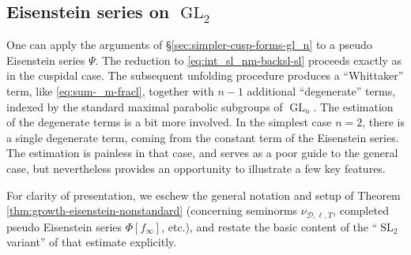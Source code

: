 \documentclass[reqno]{amsart}
\DeclareMathOperator{\SL}{SL}
\DeclareMathOperator{\GL}{GL}
\theoremstyle{plain} \newtheorem{theorem} {Theorem}
\theoremstyle{definition} \newtheorem{definition} [theorem] {Definition}
\theoremstyle{itplain} %
\numberwithin{equation}{section}
\numberwithin{theorem}{section}
\begin{document}
\subsection{Eisenstein series on $\GL_2$}
One can apply the arguments of \S\ref{sec:simpler-cusp-forms-gl_n} to a pseudo Eisenstein series $\Psi$.  The reduction to \eqref{eq:int_sl_nm-backsl-sl} proceeds exactly as in the cuspidal case.  The subsequent unfolding procedure produces a ``Whittaker'' term, like \eqref{eq:sum-_m-fracl}, together with $n-1$ additional ``degenerate'' terms, indexed by the standard maximal parabolic subgroups of $\GL_n$.  The estimation of the degenerate terms is a bit more involved.  In the simplest case $n=2$, there is a single degenerate term, coming from the constant term of the Eisenstein series.  The estimation is painless in that case, and serves as a poor guide to the general case, but nevertheless provides an opportunity to illustrate a few key features.

For clarity of presentation, we eschew the general notation and setup of Theorem \ref{thm:growth-eisenstein-nonstandard} (concerning seminorms $\nu_{\mathcal{D},\ell,T}$, completed pseudo Eisenstein series $\Phi[f_\infty]$, etc.), and restate the basic content of the ``$\SL_2$ variant'' of that estimate explicitly.
\end{document}
